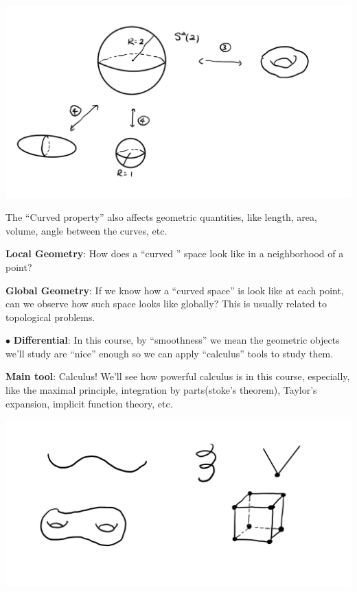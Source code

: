 \begin{center}
    \includegraphics[scale=0.2]{picture/preface/preface_example2.png}
\end{center}

The ``Curved property'' also affects geometric quantities, like length, area, volume, angle between the curves, etc.

\textbf{Local Geometry}: How does a ``curved '' space look like in a neighborhood of a point?
 
\textbf{Global Geometry}: If we know how a ``curved space'' is look like at each point, can we observe how such space looks like globally? This is usually related to topological problems.

$\bullet$ \textbf{Differential}: In this course, by ``smoothness'' we mean the geometric objects we'll study are ``nice'' enough so we can apply ``calculus'' tools to study them.

\textbf{Main tool}: Calculus! We'll see how powerful calculus is in this course, especially, like the maximal principle, integration by parts(stoke's theorem), Taylor's expansion, implicit function theory, etc.

\begin{center}
    \includegraphics[scale=0.2]{picture/preface/preface_example3.png}
\end{center}


